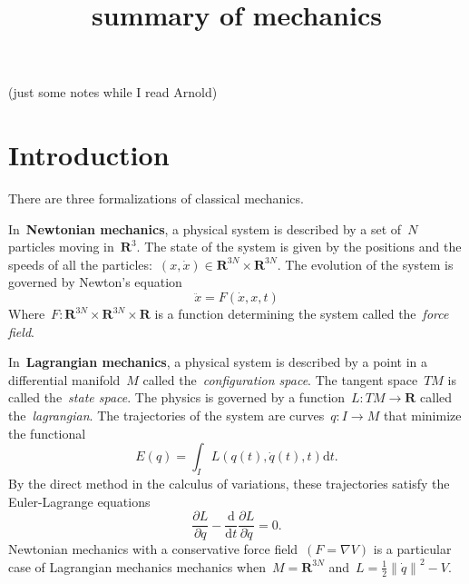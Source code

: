 

\newcommand{\1}{\mathbf{1}}
\newcommand{\R}{\mathbf{R}}
\newcommand{\T}{\mathbf{T}}
\newcommand{\Z}{\mathbf{Z}}
\newcommand{\ud}{\mathrm{d}}
\newcommand{\ds}{\displaystyle}

\newcommand{\abs}[1]{\left|#1\right|}
\newcommand{\Abs}[1]{\left\|#1\right\|}
\newcommand{\ABS}[1]{{\left\vert\kern-0.25ex\left\vert\kern-0.25ex\left\vert #1 \right\vert\kern-0.25ex\right\vert\kern-0.25ex\right\vert}}

\newcommand{\parens}[1]{\left(#1\right)} %
\newcommand{\pairing}[2]{\left\langle #1,\,#2\right\rangle} %




\title{summary of mechanics}

(just some notes while I read Arnold)

\section{Introduction}

There are three formalizations of classical mechanics.

In~{\bf Newtonian mechanics}, a physical system is described by a set of~$N$
particles moving in~$\R^3$.  The state of the system is given by the
positions and the speeds of all the
particles:~$(x,\dot x)\in\R^{3N}\times\R^{3N}$.  The evolution of the system
is governed by Newton's equation
\[
	\ddot x=F(\dot x, x,t)
\]
Where~$F:\R^{3N}\times\R^{3N}\times\R$ is a function determining the system
called the~\emph{force field}.

In~{\bf Lagrangian mechanics}, a physical system is described by a point in
a differential manifold~$M$ called the~\emph{configuration space}.  The tangent
space~$TM$ is called the~\emph{state space}.  The physics is governed by a
function~$L:TM\to\R$ called the~\emph{lagrangian}.  The trajectories of the system
are curves~$q:I\to M$ that minimize the functional
\[
	E(q)=\int_I L(q(t),\dot q(t),t)\mathrm{d}t.
\]
By the direct method in the calculus of variations, these trajectories
satisfy the Euler-Lagrange equations
\[
	\frac{\partial L}{\partial q}
	-\frac{\mathrm{d}}{\mathrm{d}t}\frac{\partial L}{\partial\dot q} = 0.
\]
Newtonian mechanics with a conservative force field~$(F=\nabla V)$
is a particular case of Lagrangian mechanics
mechanics when~$M=\R^{3N}$ and~$L=\frac12\left\|\dot q\right\|^2-V$.


